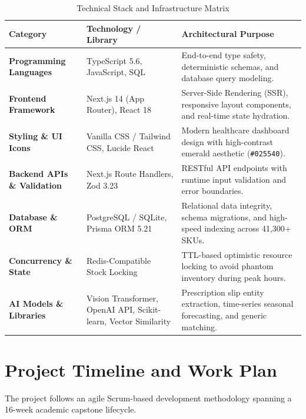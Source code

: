 \documentclass[12pt,a4paper]{article}
\begin{document}
\begin{table}[h!]
\centering
\small
\begin{tabularx}{\textwidth}{p{3.8cm}p{4.2cm}X}
\toprule
\textbf{Category} & \textbf{Technology / Library} & \textbf{Architectural Purpose} \\
\midrule
\textbf{Programming Languages} & TypeScript 5.6, JavaScript, SQL & End-to-end type safety, deterministic schemas, and database query modeling. \\
\addlinespace
\textbf{Frontend Framework} & Next.js 14 (App Router), React 18 & Server-Side Rendering (SSR), responsive layout components, and real-time state hydration. \\
\addlinespace
\textbf{Styling \& UI Icons} & Vanilla CSS / Tailwind CSS, Lucide React & Modern healthcare dashboard design with high-contrast emerald aesthetic (\texttt{\#025540}). \\
\addlinespace
\textbf{Backend APIs \& Validation} & Next.js Route Handlers, Zod 3.23 & RESTful API endpoints with runtime input validation and error boundaries. \\
\addlinespace
\textbf{Database \& ORM} & PostgreSQL / SQLite, Prisma ORM 5.21 & Relational data integrity, schema migrations, and high-speed indexing across 41,300+ SKUs. \\
\addlinespace
\textbf{Concurrency \& State} & Redis-Compatible Stock Locking & TTL-based optimistic resource locking to avoid phantom inventory during peak hours. \\
\addlinespace
\textbf{AI Models \& Libraries} & Vision Transformer, OpenAI API, Scikit-learn, Vector Similarity & Prescription slip entity extraction, time-series seasonal forecasting, and generic matching. \\
\bottomrule
\end{tabularx}
\caption{Technical Stack and Infrastructure Matrix}
\end{table}

\section{Project Timeline and Work Plan}
The project follows an agile Scrum-based development methodology spanning a 16-week academic capstone lifecycle.
\end{document}
